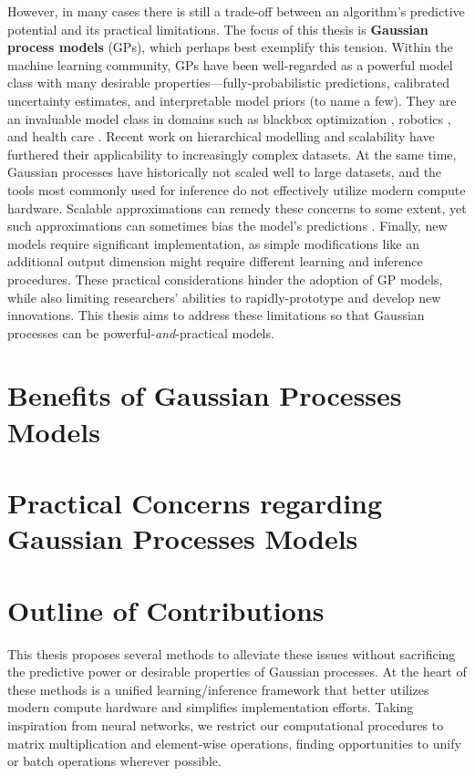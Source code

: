 However, in many cases there is still a trade-off between an algorithm's predictive potential and its practical limitations.
The focus of this thesis is {\bf Gaussian process models} (GPs), which perhaps best exemplify this tension.
Within the machine learning community, GPs have been well-regarded as a powerful model class with many desirable properties---fully-probabilistic predictions, calibrated uncertainty estimates, and interpretable model priors (to name a few).
They are an invaluable model class in domains such as blackbox optimization \cite{}, robotics \cite{}, and health care \cite{}.
Recent work on hierarchical modelling \cite{} and scalability \cite{} have furthered their applicability to increasingly complex datasets.
At the same time, Gaussian processes have historically not scaled well to large datasets, and the tools most commonly used for inference do not effectively utilize modern compute hardware.
Scalable approximations can remedy these concerns to some extent, yet such approximations can sometimes bias the model's predictions \cite{}.
Finally, new models require significant implementation, as simple modifications like an additional output dimension might require different learning and inference procedures.
These practical considerations hinder the adoption of GP models, while also limiting researchers' abilities to rapidly-prototype and develop new innovations.
This thesis aims to address these limitations so that Gaussian processes can be powerful-\emph{and}-practical models.


\section{Benefits of Gaussian Processes Models}

\section{Practical Concerns regarding Gaussian Processes Models}

\section{Outline of Contributions}

This thesis proposes several methods to alleviate these issues without sacrificing the predictive power or desirable properties of Gaussian processes.
At the heart of these methods is a unified learning/inference framework that better utilizes modern compute hardware and simplifies implementation efforts.
Taking inspiration from neural networks, we restrict our computational procedures to matrix multiplication and element-wise operations, finding opportunities to unify or batch operations wherever possible.

